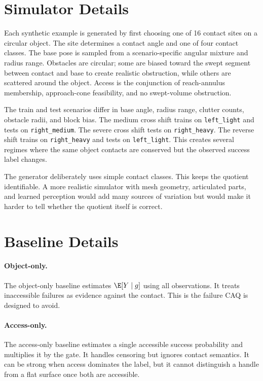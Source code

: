 \documentclass{article}
\newcommand{\class}{g}
\begin{document}
\section{Simulator Details}

Each synthetic example is generated by first choosing one of 16 contact sites on a circular object. The site determines a contact angle and one of four contact classes. The base pose is sampled from a scenario-specific angular mixture and radius range. Obstacles are circular; some are biased toward the swept segment between contact and base to create realistic obstruction, while others are scattered around the object. Access is the conjunction of reach-annulus membership, approach-cone feasibility, and no swept-volume obstruction.

The train and test scenarios differ in base angle, radius range, clutter counts, obstacle radii, and block bias. The medium cross shift trains on \texttt{left\_light} and tests on \texttt{right\_medium}. The severe cross shift tests on \texttt{right\_heavy}. The reverse shift trains on \texttt{right\_heavy} and tests on \texttt{left\_light}. This creates several regimes where the same object contacts are conserved but the observed success label changes.

The generator deliberately uses simple contact classes. This keeps the quotient identifiable. A more realistic simulator with mesh geometry, articulated parts, and learned perception would add many sources of variation but would make it harder to tell whether the quotient itself is correct.

\section{Baseline Details}

\paragraph{Object-only.}
The object-only baseline estimates $\E[Y\mid \class]$ using all observations. It treats inaccessible failures as evidence against the contact. This is the failure CAQ is designed to avoid.

\paragraph{Access-only.}
The access-only baseline estimates a single accessible success probability and multiplies it by the gate. It handles censoring but ignores contact semantics. It can be strong when access dominates the label, but it cannot distinguish a handle from a flat surface once both are accessible.
\end{document}
